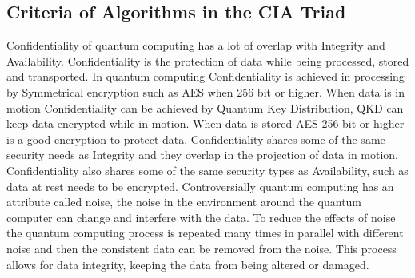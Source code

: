 \documentclass[sigconf]{acmart}
\begin{document}
\subsection{Criteria of Algorithms in the CIA Triad}
Confidentiality of quantum computing has a lot of overlap with Integrity and Availability. Confidentiality is the protection of data while being processed, stored and transported. In quantum computing Confidentiality is achieved in processing by Symmetrical encryption such as AES when 256 bit or higher. When data is in motion Confidentiality can be achieved by Quantum Key Distribution, QKD can keep data encrypted while in motion. When data is stored AES 256 bit or higher is a good encryption to protect data. Confidentiality shares some of the same security needs as Integrity and they overlap in the projection of data in motion. Confidentiality also shares some of the same security types as Availability, such as data at rest needs to be encrypted. Controversially quantum computing has an attribute called noise, the noise in the environment around the quantum computer can change and interfere with the data. To reduce the effects of noise the quantum computing process is repeated many times in parallel with different noise and then the consistent data can be removed from the noise. This process allows for data integrity, keeping the data from being altered or damaged.
\end{document}
